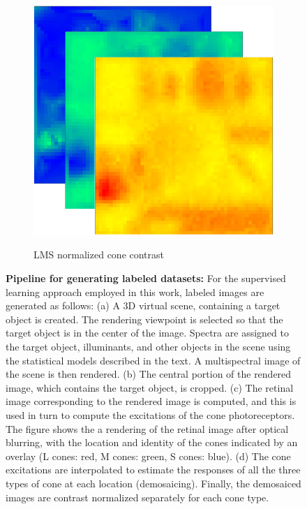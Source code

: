 \documentclass{jov}
\begin{document}
\begin{figure}
\begin{subfigure}[b]{0.19 \textwidth}
        \label{fig:croppedImageWithMosaic}
    \end{subfigure}
    ~
    \begin{subfigure}[b]{0.2 \textwidth}
        \caption{LMS normalized cone contrast}
        \includegraphics[width=\textwidth]{../FiguresDraft4/Figure9/Figure9_d.png}
        \label{fig:coneContrast}
    \end{subfigure}
    \label{fig:sceneWithCroppedImage}
    \caption{{\bf Pipeline for generating labeled datasets:}  For the supervised learning approach employed in this work, labeled images are generated as follows: (a) A 3D virtual scene, containing a target object is created. The rendering viewpoint is selected so that the target object is in the center of the image. Spectra are assigned to the target object, illuminants, and other objects in the scene using the statistical models described in the text. A multispectral image of the scene is then rendered. (b) The central portion of the rendered image, which contains the target object, is cropped. (c) The retinal image corresponding to the rendered image is computed, and this is used in turn to compute the excitations of the cone photoreceptors. The figure shows the a rendering of the retinal image after optical blurring, with the location and identity of the cones indicated by an overlay (L cones: red, M cones: green, S cones: blue).  (d) The cone excitations are interpolated to estimate the responses of all the three types of cone at each location (demosaicing). Finally, the demosaiced images are contrast normalized separately for each cone type.}
\end{figure}
\end{document}
